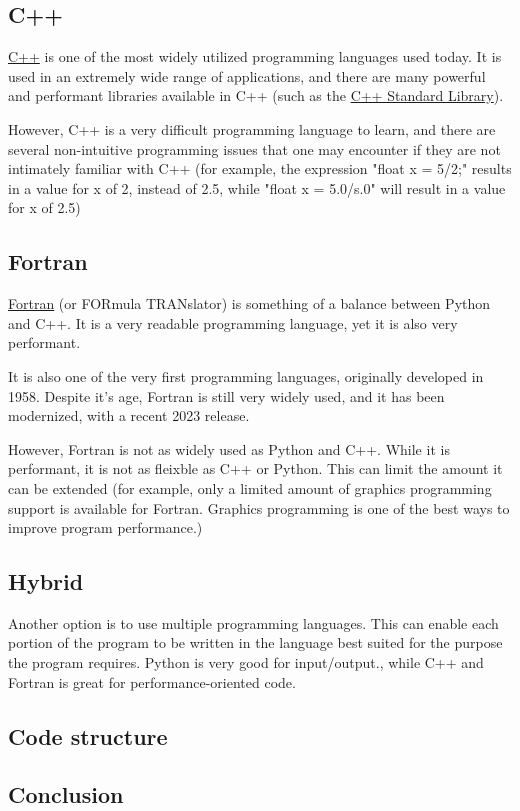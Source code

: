 \documentclass[10pt, reqno]{exam}
\begin{document}
\subsection{C++}

\href{https://en.wikipedia.org/wiki/C%2B%2B}{C++} is one of the most widely utilized programming languages used today. It is used in an extremely wide range of applications, and there are many powerful and performant libraries available in C++ (such as the \href{https://en.cppreference.com/w/cpp/header}{C++ Standard Library}). \par

However, C++ is a very difficult programming language to learn, and there are several non-intuitive programming issues that one may encounter if they are not intimately familiar with C++ (for example, the expression "float x = 5/2;" results in a value for x of 2, instead of 2.5, while "float x = 5.0/s.0" will result in a value for x of 2.5) \par

\subsection{Fortran}

\href{https://en.wikipedia.org/wiki/Fortran}{Fortran} (or FORmula TRANslator) is something of a balance between Python and C++. It is a very readable programming language, yet it is also very performant. \par

It is also one of the very first programming languages, originally developed in 1958. Despite it's age, Fortran is still very widely used, and it has been modernized, with a recent 2023 release. \par

However, Fortran is not as widely used as Python and C++. While it is performant, it is not as fleixble as C++ or Python. This can limit the amount it can be extended (for example, only a limited amount of graphics programming support is available for Fortran. Graphics programming is one of the best ways to improve program performance.) \par

\subsection{Hybrid}

Another option is to use multiple programming languages. This can enable each portion of the program to be written in the language best suited for the purpose the program requires. Python is very good for input/output., while C++ and Fortran is great for performance-oriented code. \par

\subsection{Code structure}

\subsection{Conclusion}
\end{document}
